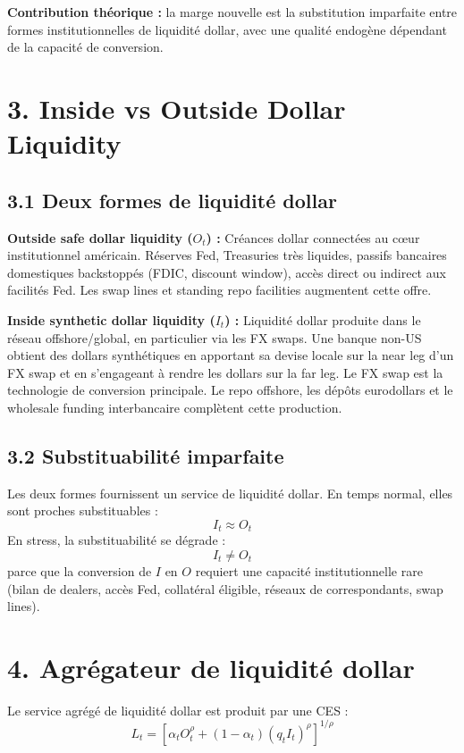 \textbf{Contribution théorique :} la marge nouvelle est la substitution
imparfaite entre formes institutionnelles de liquidité dollar, avec
une qualité endogène dépendant de la capacité de conversion.

\section*{3. Inside vs Outside Dollar Liquidity}

\subsection*{3.1 Deux formes de liquidité dollar}

\textbf{Outside safe dollar liquidity ($O_t$) :}
Créances dollar connectées au cœur institutionnel américain.
Réserves Fed, Treasuries très liquides, passifs bancaires
domestiques backstoppés (FDIC, discount window), accès direct
ou indirect aux facilités Fed. Les swap lines et standing repo
facilities augmentent cette offre.

\textbf{Inside synthetic dollar liquidity ($I_t$) :}
Liquidité dollar produite dans le réseau offshore/global, en
particulier via les FX swaps. Une banque non-US obtient des
dollars synthétiques en apportant sa devise locale sur la near
leg d'un FX swap et en s'engageant à rendre les dollars sur la
far leg. Le FX swap est la technologie de conversion principale.
Le repo offshore, les dépôts eurodollars et le wholesale
funding interbancaire complètent cette production.

\subsection*{3.2 Substituabilité imparfaite}

Les deux formes fournissent un service de liquidité dollar.
En temps normal, elles sont proches substituables :
\[
I_t \approx O_t
\]
En stress, la substituabilité se dégrade :
\[
I_t \neq O_t
\]
parce que la conversion de $I$ en $O$ requiert une capacité
institutionnelle rare (bilan de dealers, accès Fed, collatéral
éligible, réseaux de correspondants, swap lines).

\section*{4. Agrégateur de liquidité dollar}

Le service agrégé de liquidité dollar est produit par une CES :
\begin{equation}
L_t = \left[ \alpha_t O_t^{\rho} + (1 - \alpha_t)(q_t I_t)^{\rho} \right]^{1/\rho}
\label{eq:CES}
\end{equation}

